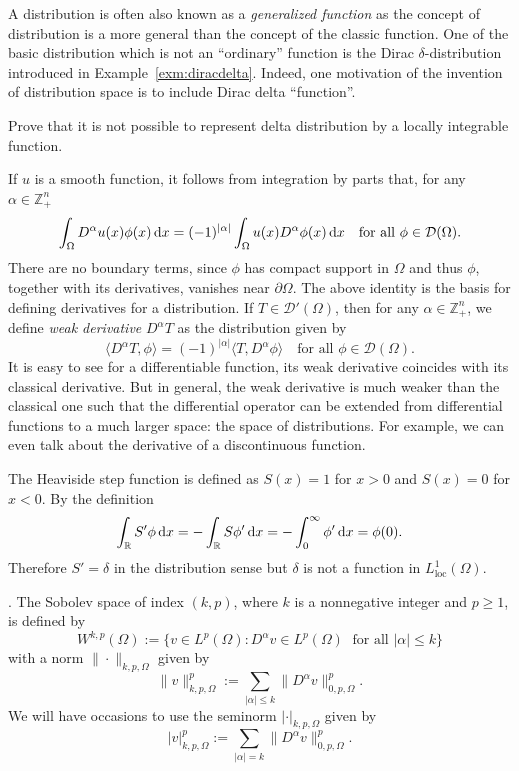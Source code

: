 A distribution is often also known as a {\it generalized function} as the concept of distribution
is a more general than the concept of the classic function. One of the basic distribution
which is not an ``ordinary'' function is the Dirac $\delta$-distribution introduced in Example~\ref{exm:diracdelta}. Indeed, one motivation of the invention of distribution space is to include Dirac delta
``function''.

\begin{exe}
Prove that it is not possible to represent delta distribution by a locally integrable
function.
\end{exe}

If $u$ is a smooth function, it follows from integration by parts that, for any $\alpha\in\mathbb Z_+^n$
\[
\int_{\Omega}D^{\alpha}u(x)\phi(x)\,{\rm d}x=(-1)^{|\alpha|}\int_{\Omega}u(x)D^{\alpha}\phi(x)\,{\rm d}x\quad\textrm{for all } \phi\in\mathcal D(\Omega).
\]
There are no boundary terms, since $\phi$ has compact support in $\Omega$
 and thus $\phi$, together with
its derivatives, vanishes near $\partial\Omega$. The above identity is the basis for defining derivatives
for a distribution. If $T\in\mathcal D'(\Omega)$, then for any $\alpha\in\mathbb Z_+^n$, we define {\it weak derivative} $D^{\alpha}T$ as
the distribution given by
\[
\langle D^{\alpha}T, \phi\rangle=(-1)^{|\alpha|}\langle T, D^{\alpha}\phi\rangle\quad\textrm{for all } \phi\in\mathcal D(\Omega).
\]
It is easy to see for a differentiable function, its weak derivative coincides with its classical
derivative. But in general, the weak derivative is much weaker than the classical one such
that the differential operator can be extended from differential functions to a much larger
space: the space of distributions. For example, we can even talk about the derivative of a
discontinuous function.

\begin{exm}
The Heaviside step function is defined as $S(x) = 1$ for $x > 0$ and $S(x) = 0$
for $x < 0$. By the definition
\[
\int_{\mathbb R}S'\phi\,{\rm d}x=-\int_{\mathbb R}S\phi'\,{\rm d}x=-\int_0^{\infty}\phi'\,{\rm d}x=\phi(0).
\]
Therefore $S'=\delta$ in the distribution sense but \textcolor[rgb]{1.00,0.00,0.00}{$\delta$ is not a function in $L_{\textrm{loc}}^1(\Omega)$}.
\end{exm}

\vskip0.5cm.
The Sobolev space of index $(k, p)$, where $k$ is a nonnegative
integer and $p\geq1$, is defined by
\[
W^{k,p}(\Omega):=\{v\in L^p(\Omega): D^{\alpha}v\in L^p(\Omega)\;\textrm{  for all } |\alpha|\leq k\}
\]
with a norm $\|\cdot\|_{k,p,\Omega}$
 given by
\[
\|v\|_{k,p,\Omega}^p:=\sum_{|\alpha|\leq k}\|D^{\alpha}v\|_{0,p,\Omega}^p.
\]
We will have occasions to use the seminorm $|\cdot|_{k,p,\Omega}$
 given by
\[
|v|_{k,p,\Omega}^p:=\sum_{|\alpha|= k}\|D^{\alpha}v\|_{0,p,\Omega}^p.
\]

